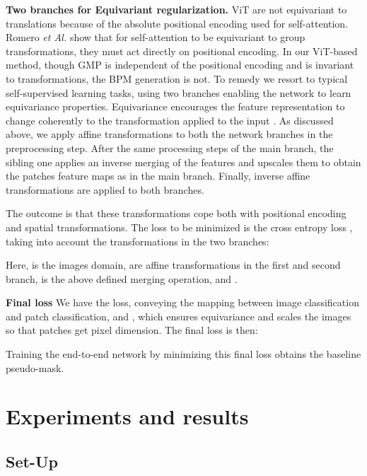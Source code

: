 \documentclass[runningheads]{styles/llncs}
\begin{document}
\noindent
{\bf Two branches for Equivariant regularization.} \label{par:equiv}
 ViT are not equivariant to translations because of the absolute positional encoding used for self-attention. Romero {\em et Al.} \cite{romero2020group} show that for self-attention to be equivariant to group transformations, they must act directly on positional encoding. 
 In our ViT-based method, though GMP is independent of the positional encoding and is invariant to transformations, the BPM generation is not. 
To remedy we resort to typical self-supervised learning tasks, using two branches enabling the network to learn equivariance properties. Equivariance encourages the feature representation to change coherently to the transformation applied to the input \cite{dangovski2021equivariant}. As discussed above, we apply affine transformations to both the network branches in the preprocessing step.  
After the same processing steps of the main branch, the sibling one applies an inverse merging of the features and upscales them to obtain the   patches feature maps as in the main branch. Finally,  inverse affine transformations are applied to both branches. 

The outcome is that these transformations cope both with positional encoding and spatial transformations.
The loss to be minimized is the cross entropy  loss , taking into account the transformations in the two branches:
 

Here,  is the images domain,   are affine transformations in the first and second branch,  is the above defined merging operation, and . 

\noindent
{\bf Final loss}
We have the  loss, conveying the mapping between image classification and patch classification, and  , which ensures equivariance and scales the images so that patches get pixel dimension. The  final loss is then:

Training the end-to-end network by minimizing this final loss obtains the baseline pseudo-mask.
\section{Experiments and results}\label{sec:exp}
\subsection{Set-Up}\label{subsec:impdet}
\end{document}
